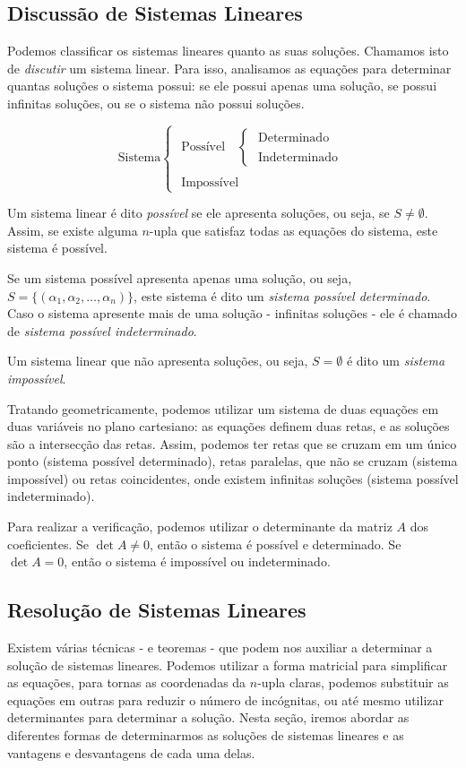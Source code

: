 \subsection{Discussão de Sistemas Lineares\cite{matriz}} 
Podemos classificar os sistemas lineares quanto as suas soluções. Chamamos isto de \emph{discutir} um sistema linear. Para isso, analisamos as equações para determinar quantas soluções o sistema possui: se ele possui apenas uma solução, se possui infinitas soluções, ou se o sistema não possui soluções.

\[\text{Sistema} \begin{cases}
\text{ Possível}\quad 
	\begin{cases}
	\text{ Determinado} \\
    \\
    \text{ Indeterminado}
	\end{cases}\\
    \\
\text{ Impossível}
\end{cases}\] \par
Um sistema linear é dito \emph{possível} se ele apresenta soluções, ou seja, se $S\neq\emptyset$. Assim, se existe alguma $n$-upla que satisfaz todas as equações do sistema, este sistema é possível. \par 
Se um sistema possível apresenta apenas uma solução, ou seja, $S=\{(\alpha_1,\alpha_2,\dots,\alpha_n)\}$, este sistema é dito um \emph{sistema possível determinado}. Caso o sistema apresente mais de uma solução - infinitas soluções - ele é chamado de \emph{sistema possível indeterminado}. \par 
Um sistema linear que não apresenta soluções, ou seja, $S=\emptyset$ é dito um \emph{sistema impossível}. \par
Tratando geometricamente, podemos utilizar um sistema de duas equações em duas variáveis no plano cartesiano: as equações definem duas retas, e as soluções são a intersecção das retas. Assim, podemos ter retas que se cruzam em um único ponto (sistema possível determinado), retas paralelas, que não se cruzam (sistema impossível) ou retas coincidentes, onde existem infinitas soluções (sistema possível indeterminado). \par 
Para realizar a verificação, podemos utilizar o determinante da matriz $A$ dos coeficientes. Se $\det A \neq 0$, então o sistema é possível e determinado. Se $\det A = 0$, então o sistema é impossível ou indeterminado.

\subsection{Resolução de Sistemas Lineares}
Existem várias técnicas - e teoremas - que podem nos auxiliar a determinar a solução de sistemas lineares. Podemos utilizar a forma matricial para simplificar as equações, para tornas as coordenadas da $n$-upla claras, podemos substituir as equações em outras para reduzir o número de incógnitas, ou até mesmo utilizar determinantes para determinar a solução. Nesta seção, iremos abordar as diferentes formas de determinarmos as soluções de sistemas lineares e as vantagens e desvantagens de cada uma delas.

